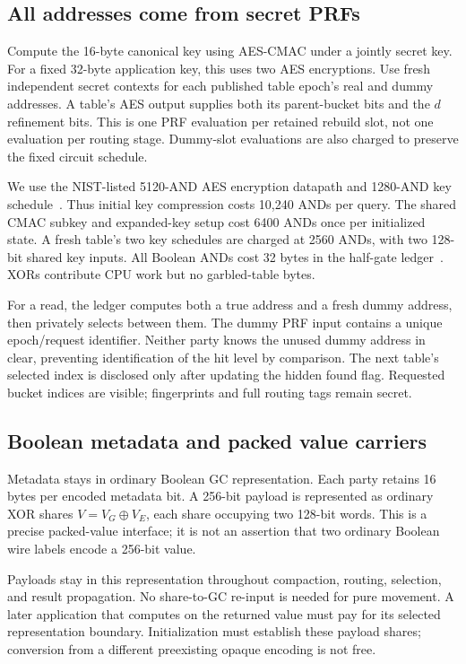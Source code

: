 \documentclass[11pt]{article}
\newcommand{\xor}{\mathbin{\oplus}}
\begin{document}
\subsection{All addresses come from secret PRFs}
Compute the 16-byte canonical key using AES-CMAC under a jointly secret key.
For a fixed 32-byte application key, this uses two AES encryptions. Use fresh
independent secret contexts for each published table epoch's real and dummy
addresses. A table's AES output supplies both its parent-bucket bits and
the $d$ refinement bits. This is one PRF evaluation per retained rebuild
slot, not one evaluation per routing stage. Dummy-slot evaluations are
also charged to preserve the fixed circuit schedule.

We use the NIST-listed 5120-AND AES encryption datapath and 1280-AND key
schedule~\cite{nistcircuits}. Thus initial key compression costs 10,240
ANDs per query. The shared CMAC subkey and expanded-key setup cost 6400
ANDs once per initialized state. A fresh table's two key schedules are
charged at 2560 ANDs, with two 128-bit shared key inputs. All Boolean
ANDs cost 32 bytes in the half-gate ledger~\cite{halfgates}. XORs contribute
CPU work but no garbled-table bytes.

For a read, the ledger computes both a true address and a fresh dummy
address, then privately selects between them. The dummy PRF input contains
a unique epoch/request identifier. Neither party knows the unused dummy
address in clear, preventing identification of the hit level by comparison.
The next table's selected index is disclosed only after updating the hidden
found flag. Requested bucket indices are visible; fingerprints and full
routing tags remain secret.

\subsection{Boolean metadata and packed value carriers}
Metadata stays in ordinary Boolean GC representation. Each party retains
16 bytes per encoded metadata bit. A 256-bit payload is represented as
ordinary XOR shares $V=V_G\xor V_E$, each share occupying two 128-bit
words. This is a precise packed-value interface; it is not an assertion
that two ordinary Boolean wire labels encode a 256-bit value.

Payloads stay in this representation throughout compaction, routing,
selection, and result propagation. No share-to-GC re-input is needed for
pure movement. A later application that computes on the returned value
must pay for its selected representation boundary. Initialization must
establish these payload shares; conversion from a different preexisting
opaque encoding is not free.
\end{document}
